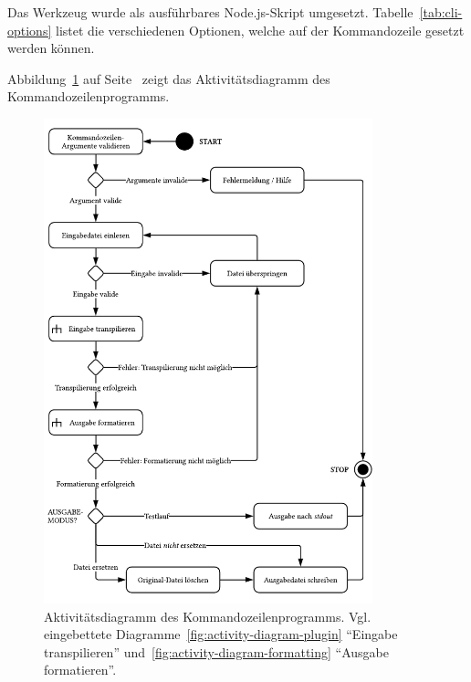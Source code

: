 Das Werkzeug wurde als ausführbares Node.js-Skript umgesetzt. Tabelle~\ref{tab:cli-options} listet die verschiedenen Optionen, welche auf der Kommandozeile gesetzt werden können.




Abbildung~\ref{fig:activity-diagram-cli} auf Seite~\pageref{fig:activity-diagram-cli} zeigt das Aktivitätsdiagramm des Kommandozeilenprogramms.

\begin{figure}[tbp]
  \centering
  \includegraphics[width=0.85\textwidth]{src/4_Umsetzung/fig/activity-diagram-cli.pdf}
	\caption[Aktivitätsdiagramm des Kommandozeilenprogramms]{Aktivitätsdiagramm des Kommandozeilenprogramms. Vgl. eingebettete Diagramme~\ref{fig:activity-diagram-plugin} \enquote{Eingabe transpilieren} und~\ref{fig:activity-diagram-formatting} \enquote{Ausgabe formatieren}.}
	\label{fig:activity-diagram-cli}
\end{figure}

